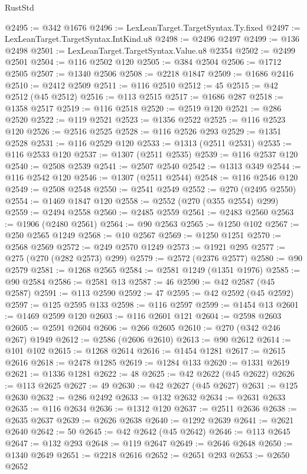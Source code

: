 \begin{lexlean}{RustStd}
\begin{coremodule}
@2495 := @342 @1676
@2496 := LexLeanTarget.TargetSyntax.Ty.fixed
@2497 := LexLeanTarget.TargetSyntax.IntKind.u8
@2498 := @2496 @2497
@2499 := @136 @2498
@2501 := LexLeanTarget.TargetSyntax.Value.u8 @2354
@2502 := @2499 @2501
@2504 := @116 @2502 @120
@2505 := @384 @2504
@2506 := @1712 @2505
@2507 := @1340 @2506
@2508 := @2218 @1847
@2509 := @1686 @2416
@2510 := @2412 @2509
@2511 := @116 @2510
@2512 := 45
@2515 := @42 @2512 (@45 @2512)
@2516 := @113 @2515
@2517 := @1686 @287
@2518 := @1358 @2517
@2519 := @116 @2518
@2520 := @2519 @120
@2521 := @286 @2520
@2522 := @119 @2521
@2523 := @1356 @2522
@2525 := @116 @2523 @120
@2526 := @2516 @2525
@2528 := @116 @2526 @293
@2529 := @1351 @2528
@2531 := @116 @2529 @120
@2533 := @1313 (@2511 @2531)
@2535 := @116 @2533 @120
@2537 := @1307 (@2511 @2535)
@2539 := @116 @2537 @120
@2540 := @2508 @2539
@2541 := @2507 @2540
@2542 := @1313 @349
@2544 := @116 @2542 @120
@2546 := @1307 (@2511 @2544)
@2548 := @116 @2546 @120
@2549 := @2508 @2548
@2550 := @2541 @2549
@2552 := @270 (@2495 @2550)
@2554 := @1469 @1847 @120
@2558 := @2552 (@270 (@355 @2554) @299)
@2559 := @2494 @2558
@2560 := @2485 @2559
@2561 := @2483 @2560
@2563 := @1906 (@2480 @2561)
@2564 := @90 @2563
@2565 := @1250 @102
@2567 := @250 @2565 @1249
@2568 := @10 @2567
@2569 := @1250 @1251
@2570 := @2568 @2569
@2572 := @249 @2570 @1249
@2573 := @1921 @295
@2577 := @275 (@270 (@282 @2573) @299)
@2579 := @2572 (@2376 @2577)
@2580 := @90 @2579
@2581 := @1268 @2565
@2584 := @2581 @1249 (@1351 @1976)
@2585 := @90 @2584
@2586 := @2581 @13
@2587 := 46
@2590 := @42 @2587 (@45 @2587)
@2591 := @113 @2590
@2592 := 47
@2595 := @42 @2592 (@45 @2592)
@2597 := @125 @2595 @133
@2598 := @116 @2597
@2599 := @1454 @13
@2601 := @1469 @2599 @120
@2603 := @116 @2601 @121
@2604 := @2598 @2603
@2605 := @2591 @2604
@2606 := @266 @2605
@2610 := @270 (@342 @246 @267) @1949
@2612 := @2586 (@2606 @2610)
@2613 := @90 @2612
@2614 := @101 @102
@2615 := @1268 @2614
@2616 := @1454 @1281
@2617 := @2615 @2616
@2618 := @2478 @1285
@2619 := @1284 @133
@2620 := @1331 @2619
@2621 := @1336 @1281
@2622 := 48
@2625 := @42 @2622 (@45 @2622)
@2626 := @113 @2625
@2627 := 49
@2630 := @42 @2627 (@45 @2627)
@2631 := @125 @2630
@2632 := @286 @2492
@2633 := @132 @2632
@2634 := @2631 @2633
@2635 := @116 @2634
@2636 := @1312 @120
@2637 := @2511 @2636
@2638 := @2635 @2637
@2639 := @2626 @2638
@2640 := @1292 @2639
@2641 := @2621 @2640
@2642 := 50
@2645 := @42 @2642 (@45 @2642)
@2646 := @113 @2645
@2647 := @132 @293
@2648 := @119 @2647
@2649 := @2646 @2648
@2650 := @1340 @2649
@2651 := @2218 @2616
@2652 := @2651 @293
@2653 := @2650 @2652

\end{coremodule}
\end{lexlean}

